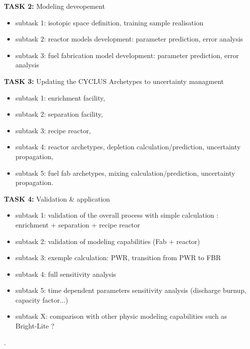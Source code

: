 \documentclass[dvips,12pt]{article}
\begin{document}
\noindent\textbf{TASK 2:} Modeling deveopement
\begin{itemize}
\item subtask 1: isotopic space definition, training sample realisation
\item subtask 2: reactor models development: parameter prediction, error analysis
\item subtask 3: fuel fabrication model development: parameter prediction, error analysis 
\end{itemize}


\noindent\textbf{TASK 3:} Updating the CYCLUS Archetypes to uncertainty managment
\begin{itemize}
\item subtask 1: enrichment facility, 
\item subtask 2: separation facility,
\item subtask 3: recipe reactor,
\item subtask 4: reactor archetypes, depletion calculation/prediction, uncertainty propagation,
\item subtask 5: fuel fab archetypes, mixing calculation/prediction, uncertainty propagation.
\end{itemize}
 
\noindent\textbf{TASK 4:} Validation \& application
\begin{itemize}
\item subtask 1: validation of the overall process with simple calculation : enrichment + separation + recipe reactor
\item subtask 2: validation of modeling capabilities (Fab + reactor)

\item subtask 3: exemple calculation: PWR, transition from PWR to FBR
\item subtask 4: full sensitivity analysis

\item subtask 5: time dependent parameters sensitivity analysis (discharge burnup, capacity factor...)

\item subtask X: comparison with other physic modeling capabilities such as Bright-Lite ?
\end{itemize}


\pagebreak
.
\pagebreak
\end{document}
